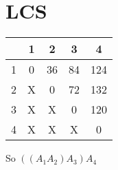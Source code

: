 \documentclass{article}
\begin{document}
\setcounter{section}{10}
\section{LCS}

\begin{tabular}{ l | c | c | c | c }
& 1 & 2 & 3 & 4 \\ \hline
1 & 0 & 36 & 84 & 124 \\ \hline
2 & X & 0 & 72 & 132\\ \hline
3 & X & X & 0 & 120 \\ \hline
4 & X & X & X & 0 \\ \hline
\end{tabular}

So $((A_1 A_2) A_3) A_4$
\end{document}
